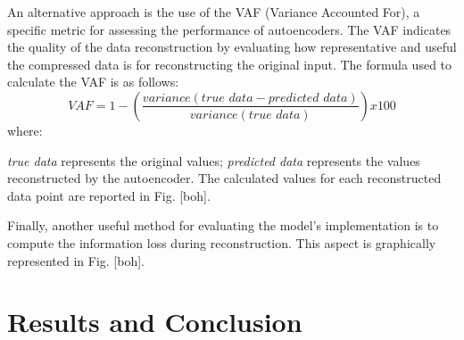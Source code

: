 \documentclass[9pt,technote]{IEEEtran}
\begin{document}
An alternative approach is the use of the VAF (Variance Accounted For), a specific metric for assessing the performance of autoencoders. The VAF indicates the quality of the data reconstruction by evaluating how representative and useful the compressed data is for reconstructing the original input. The formula used to calculate the VAF is as follows:
\begin{equation*}
	VAF = 1 - (\frac{variance(\textit{true data} - \textit{predicted data})}{variance(\textit{true data})}) x 100
\end{equation*}
where:

\textit{true data} represents the original values;
\textit{predicted data} represents the values reconstructed by the autoencoder.
The calculated values for each reconstructed data point are reported in Fig. [boh].

Finally, another useful method for evaluating the model's implementation is to compute the information loss during reconstruction. This aspect is graphically represented in Fig. [boh].

\section{Results and Conclusion}
\end{document}
